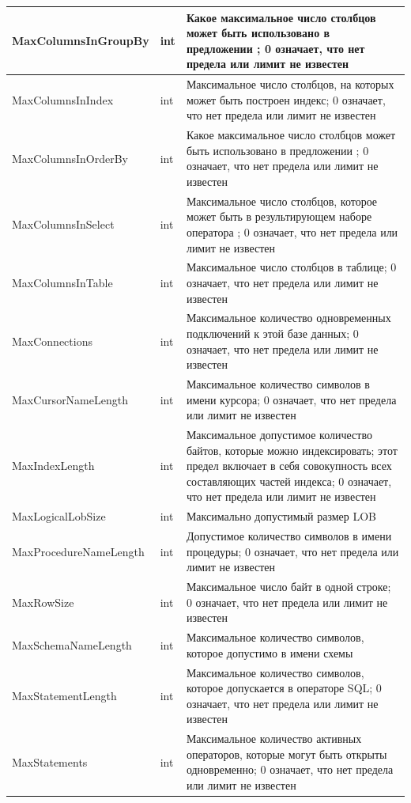 \begin{longtable}[c]{|>{\ttfamily}m{5.1cm}|>{\ttfamily\centering}m{1.3cm}|m{9.2cm}|}
	MaxColumnsInGroupBy & int & Какое максимальное число столбцов может быть использовано в предложении \ttt{GROUP BY}; 0 означает, что нет предела или лимит не известен\\\hline 
	MaxColumnsInIndex & int & Максимальное число столбцов, на которых может быть построен индекс; 0 означает, что нет предела или лимит не известен \\\hline 
	MaxColumnsInOrderBy & int & Какое максимальное число столбцов может быть использовано в предложении \ttt{ORDER BY}; 0 означает, что нет предела или лимит не известен\\\hline 
	MaxColumnsInSelect & int & Максимальное число столбцов, которое может быть в результирующем наборе оператора \ttt{SELECT}; 0 означает, что нет предела или лимит не известен\\\hline 
	MaxColumnsInTable & int & Максимальное число столбцов в таблице; 0 означает, что нет предела или лимит не известен \\\hline 
	MaxConnections & int & Максимальное количество одновременных подключений к этой базе данных; 0 означает, что нет предела или лимит не известен\\\hline 
	MaxCursorNameLength & int & Максимальное количество символов в имени курсора; 0 означает, что нет предела или лимит не известен\\\hline 
	MaxIndexLength & int & Максимальное допустимое количество байтов, которые можно индексировать; этот предел включает в себя совокупность всех составляющих частей индекса; 0 означает, что нет предела или лимит не известен\\\hline 
	MaxLogicalLobSize & int & Максимально допустимый размер LOB \\\hline 
	MaxProcedureNameLength & int & Допустимое количество символов в имени процедуры; 0 означает, что нет предела или лимит не известен\\\hline 
	MaxRowSize & int & Максимальное число байт в одной строке; 0 означает, что нет предела или лимит не известен \\\hline 
	MaxSchemaNameLength & int & Максимальное количество символов, которое допустимо в имени схемы\\\hline 
	MaxStatementLength & int & Максимальное количество символов, которое допускается в операторе SQL; 0 означает, что нет предела или лимит не известен\\\hline 
	MaxStatements & int & Максимальное количество активных операторов, которые могут быть открыты одновременно; 0 означает, что нет предела или лимит не известен\\\hline 

\end{longtable}
